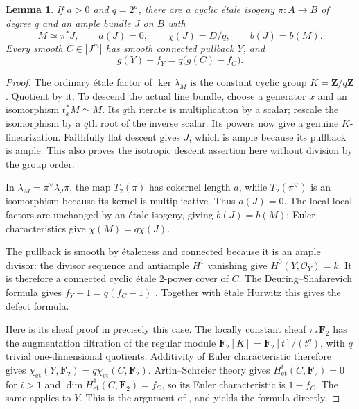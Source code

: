 \documentclass[11pt]{article}
\newtheorem{lemma}[theorem]{Lemma}
\theoremstyle{definition}\newtheorem{definition}[theorem]{Definition}
\theoremstyle{remark}\newtheorem{remark}[theorem]{Remark}
\newcommand{\OO}{\mathcal O}
\begin{document}
\begin{lemma}\label{lem:p10quotient}
If $a>0$ and $q=2^a$, there are a cyclic \'etale isogeny $\pi:A\to B$ of degree $q$ and an ample bundle $J$ on $B$ with
\[
 M\simeq\pi^*J,\qquad a(J)=0,\qquad \chi(J)=D/q,
 \qquad b(J)=b(M).
\]
Every smooth $C\in|J^m|$ has smooth connected pullback $Y$, and
\[
                       g(Y)-f_Y=q\bigl(g(C)-f_C\bigr).
\]
\end{lemma}
\begin{proof}
The ordinary \'etale factor of $\ker\lambda_M$ is the constant cyclic group $K=\mathbf Z/q\mathbf Z$. Quotient by it. To descend the actual line bundle, choose a generator $x$ and an isomorphism $t_x^*M\simeq M$. Its $q$th iterate is multiplication by a scalar; rescale the isomorphism by a $q$th root of the inverse scalar. Its powers now give a genuine $K$-linearization. Faithfully flat descent gives $J$, which is ample because its pullback is ample. This also proves the isotropic descent assertion here without division by the group order.

In $\lambda_M=\pi^\vee\lambda_J\pi$, the map $T_2(\pi)$ has cokernel length $a$, while $T_2(\pi^\vee)$ is an isomorphism because its kernel is multiplicative. Thus $a(J)=0$. The local-local factors are unchanged by an \'etale isogeny, giving $b(J)=b(M)$; Euler characteristics give $\chi(M)=q\chi(J)$.

The pullback is smooth by \'etaleness and connected because it is an ample divisor: the divisor sequence and antiample $H^1$ vanishing give $H^0(Y,\OO_Y)=k$. It is therefore a connected cyclic \'etale $2$-power cover of $C$. The Deuring--Shafarevich formula gives $f_Y-1=q(f_C-1)$ \citep[Theorem~1.5, Corollaries~1.7--1.8 and equation~(1.8.2), pp.~34--36]{Crew}. Together with \'etale Hurwitz this gives the defect formula.

Here is its sheaf proof in precisely this case. The locally constant sheaf $\pi_*\mathbf F_2$ has the augmentation filtration of the regular module $\mathbf F_2[K]=\mathbf F_2[t]/(t^q)$, with $q$ trivial one-dimensional quotients. Additivity of Euler characteristic therefore gives $\chi_{\mathrm{et}}(Y,\mathbf F_2)=q\chi_{\mathrm{et}}(C,\mathbf F_2)$. Artin--Schreier theory gives $H^i_{\mathrm{et}}(C,\mathbf F_2)=0$ for $i>1$ and $\dim H^1_{\mathrm{et}}(C,\mathbf F_2)=f_C$, so its Euler characteristic is $1-f_C$. The same applies to $Y$. This is the argument of \citet[\S3, first alternative proof, p.~42; Lemma~1.9.2, p.~37]{Crew}, and yields the formula directly.
\end{proof}
\end{document}
